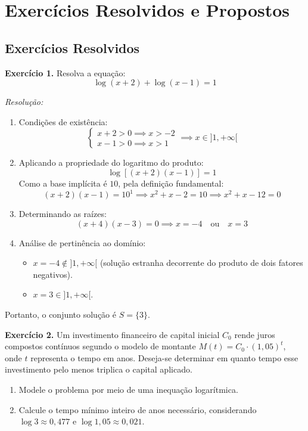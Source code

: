 \documentclass[12pt,a4paper]{report}
\begin{document}
	\section{Exercícios Resolvidos e Propostos}
	
	\subsection*{Exercícios Resolvidos}
	
	\textbf{Exercício 1.} Resolva a equação:
	$$\log (x + 2) + \log (x - 1) = 1$$
	
	\textit{Resolução:}
	\begin{enumerate}[label=\textbf{\arabic*.}]
		\item Condições de existência:
		$$\begin{cases}
			x + 2 > 0 \implies x > -2 \\
			x - 1 > 0 \implies x > 1
		\end{cases} \implies x \in {]1, +\infty[}$$
		
		\item Aplicando a propriedade do logaritmo do produto:
		$$\log[(x + 2)(x - 1)] = 1$$
		Como a base implícita é $10$, pela definição fundamental:
		$$(x + 2)(x - 1) = 10^1 \implies x^2 + x - 2 = 10 \implies x^2 + x - 12 = 0$$
		
		\item Determinando as raízes:
		$$(x + 4)(x - 3) = 0 \implies x = -4 \quad \text{ou} \quad x = 3$$
		
		\item Análise de pertinência ao domínio:
		\begin{itemize}[label=$\circ$]
			\item $x = -4 \notin {]1, +\infty[}$ (solução estranha decorrente do produto de dois fatores negativos).
			\item $x = 3 \in {]1, +\infty[}$.
		\end{itemize}
	\end{enumerate}
	Portanto, o conjunto solução é $S = \{3\}$.
	
	\vspace{0.3cm}
	
	\textbf{Exercício 2.} Um investimento financeiro de capital inicial $C_0$ rende juros compostos contínuos segundo o modelo de montante $M(t) = C_0 \cdot (1{,}05)^t$, onde $t$ representa o tempo em anos. Deseja-se determinar em quanto tempo esse investimento pelo menos triplica o capital aplicado.
	\begin{enumerate}[label=\textbf{\alph*)}]
		\item Modele o problema por meio de uma inequação logarítmica.
		\item Calcule o tempo mínimo inteiro de anos necessário, considerando $\log 3 \approx 0{,}477$ e $\log 1{,}05 \approx 0{,}021$.
	\end{enumerate}
	
\end{document}
